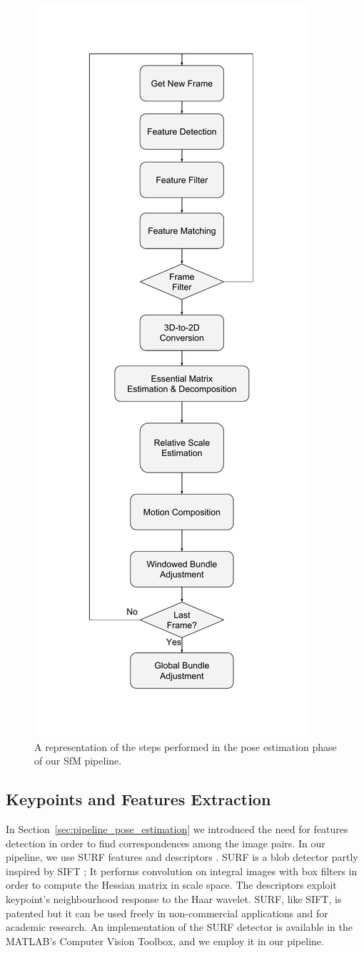 \begin{figure}
	\centering
	\includegraphics[width=0.5\linewidth]{img/sfm_block.pdf}
	\caption{A representation of the steps performed in the pose estimation 
	phase of our SfM pipeline.}
	\label{fig:sfm_block}
\end{figure}

\subsection{Keypoints and Features Extraction}
In Section~\ref{sec:pipeline_pose_estimation} we introduced the need for 
features detection in order to find correspondences among the image pairs.
In our pipeline, we use SURF features and descriptors 
\cite{bay2006surf}. SURF is a blob detector partly inspired by SIFT
\cite{lowe1999object};
It performs convolution on integral images with box filters in order to 
compute the Hessian matrix in scale space.
The descriptors exploit keypoint's neighbourhood response to the Haar wavelet.
SURF, like SIFT, is patented but it can be used freely in non-commercial
applications and for academic research.
An implementation of the SURF detector is available in the MATLAB's Computer 
Vision Toolbox, and we employ it in our pipeline.

